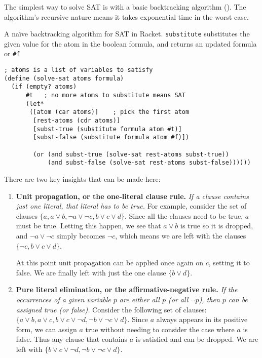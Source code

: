 The simplest way to solve SAT is with a basic backtracking algorithm
(). The algorithm's recursive nature means it takes
exponential time in the worst case.

\begin{program}

\caption[A na\"{i}ve backtracking algorithm for SAT in Racket]
{A na\"{i}ve backtracking algorithm for SAT in Racket.
\texttt{substitute} substitutes the given value for the atom in the boolean
formula, and returns an updated formula or \texttt{\#f}}

\label{fig:sat-backtracking}
\begin{verbatim}
; atoms is a list of variables to satisfy
(define (solve-sat atoms formula)
  (if (empty? atoms)
      #t   ; no more atoms to substitute means SAT
      (let*
       ([atom (car atoms)]    ; pick the first atom
        [rest-atoms (cdr atoms)]
        [subst-true (substitute formula atom #t)]
        [subst-false (substitute formula atom #f)])

        (or (and subst-true (solve-sat rest-atoms subst-true))
            (and subst-false (solve-sat rest-atoms subst-false))))))
\end{verbatim}
\end{program}

There are two key insights that can be made here:

\begin{enumerate}

\item \textbf{Unit propagation, or the one-literal clause rule.} \textit{If a
clause contains just one literal, that literal has to be true.} For example,
consider the set of clauses $\{a, a \vee b, \neg a \vee \neg c, b \vee c \vee
d\}$. Since all the clauses need to be true, $a$ must be true. Letting this
happen, we see that $a \vee b$ is true so it is dropped, and $\neg a \vee \neg
c$ simply becomes $\neg c$, which means we are left with the clauses $\{\neg
c, b \vee c \vee d\}$.

At this point unit propagation can be applied once again on $c$, setting it to
false. We are finally left with just the one clause $\{b \vee d\}$.

\item \textbf{Pure literal elimination, or the affirmative-negative rule.}
\textit{If the occurrences of a given variable $p$ are either all $p$ (or all
$\neg p$), then $p$ can be assigned true (or false).} Consider the following
set of clauses: $\{a \vee b, a \vee c, b \vee c \vee \neg d, \neg b \vee \neg
c \vee d\}$. Since $a$ always appears in its positive form, we can assign $a$
true without needing to consider the case where $a$ is false. Thus any clause
that contains $a$ is satisfied and can be dropped. We are left with $\{b \vee
c \vee \neg d, \neg b \vee \neg c \vee d\}$.

\end{enumerate}


